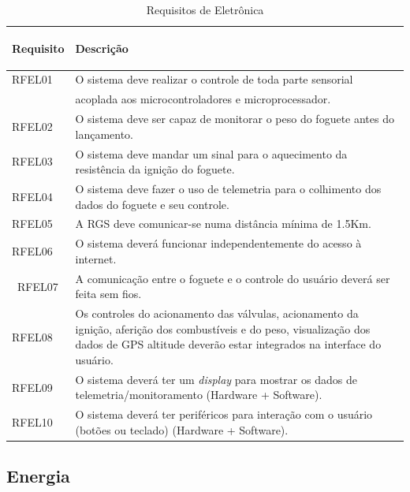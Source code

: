 \begin{table}[H]
\centering
\begin{tabular}{| m{2cm} | m{12cm}| } 
 \hline
 \textbf{Requisito} & \begin{center}\textbf{Descrição}\end{center} \\ 
 \hline
 RFEL01 & O sistema deve realizar o controle de toda parte sensorial\\
 &acoplada aos microcontroladores e microprocessador.\\
 \hline
 RFEL02 & O sistema deve ser capaz de monitorar o peso do foguete antes do lançamento.\\ 
 \hline
 RFEL03 & O sistema deve mandar um sinal para o aquecimento da resistência da ignição do foguete.\\ 
 \hline
 RFEL04 & O sistema deve fazer o uso de telemetria para o colhimento dos dados do foguete e seu controle.\\ 
 \hline
 RFEL05 & A RGS deve comunicar-se numa distância mínima de 1.5Km.\\ 
 \hline
 RFEL06 & O sistema deverá funcionar independentemente do acesso à internet.\\ 
 \hline
\ RFEL07 & A comunicação entre o foguete e o controle do usuário deverá ser feita sem fios.\\ 
 \hline
 RFEL08 & Os controles do acionamento das válvulas, acionamento da ignição, aferição dos combustíveis e do peso, visualização dos dados de GPS altitude deverão estar integrados na interface do usuário. \\ 
 \hline
 RFEL09 &  O sistema deverá ter um \textit{display} para mostrar os dados de telemetria/monitoramento (Hardware +  Software).\\ 
 \hline
 RFEL10 &  O sistema deverá ter periféricos para interação com o usuário (botões ou teclado) (Hardware + Software).\\ 
\hline

\end{tabular}
\label{Requisitos de Eletrônica}
\caption{Requisitos de Eletrônica}
\end{table}


\subsection{Energia}

